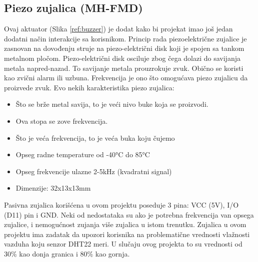\documentclass[a4paper, 12pt]{article}
\begin{document}
	\subsection{Piezo zujalica (MH-FMD)}
	
	Ovaj aktuator (Slika \ref{ref:buzzer}) je dodat kako bi projekat imao još jedan dodatni način interakcije sa korisnikom. Princip rada piezoelektrične zujalice je zasnovan na dovođenju struje na piezo-električni disk koji je spojen sa tankom metalnom pločom. Piezo-električni disk osciluje zbog čega dolazi do savijanja metala napred-nazad. To savijanje metala prouzrokuje zvuk. Obično se koristi kao zvični alarm ili uzbuna. Frekvencija je ono što omogućava piezo zujalicu da proizvede zvuk. Evo nekih karakteristika piezo zujalica:
\begin{itemize}
	\item Što se brže metal savija, to je veći nivo buke koja se proizvodi.
	\item Ova stopa se zove frekvencija.
	\item Što je veća frekvencija, to je veća buka koju čujemo
	\item Opseg radne temperature od -40°C do 85°C
	\item Opseg frekvencije ulazne 2-5kHz (kvadratni signal)
	\item Dimenzije: 32x13x13mm
\end{itemize}

\vspace{10pt}

	Pasivna zujalica korišćena u ovom projektu poseduje 3 pina: VCC (5V), I/O (D11) pin i GND. Neki od nedostataka su ako je potrebna frekvencija van opsega zujalice, i nemogućnost zujanja više zujalica u istom trenutku. Zujalica u ovom projektu ima zadatak da upozori korisnika na problematične vrednosti vlažnosti vazduha koju senzor DHT22 meri. U slučaju ovog projekta to su vrednosti od 30\% kao donja granica i 80\% kao gornja.
	
\end{document}
